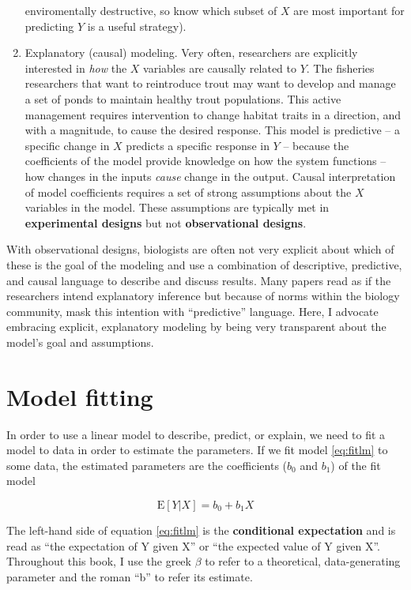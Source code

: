 \documentclass[]{book}
\theoremstyle{definition}
\theoremstyle{definition}
\theoremstyle{definition}
\theoremstyle{remark}
\begin{document}
\begin{enumerate}
  enviromentally destructive, so know which subset of \(X\) are most
  important for predicting \(Y\) is a useful strategy).
\item
  Explanatory (causal) modeling. Very often, researchers are explicitly
  interested in \emph{how} the \(X\) variables are causally related to
  \(Y\). The fisheries researchers that want to reintroduce trout may
  want to develop and manage a set of ponds to maintain healthy trout
  populations. This active management requires intervention to change
  habitat traits in a direction, and with a magnitude, to cause the
  desired response. This model is predictive -- a specific change in
  \(X\) predicts a specific response in \(Y\) -- because the
  coefficients of the model provide knowledge on how the system
  functions -- how changes in the inputs \emph{cause} change in the
  output. Causal interpretation of model coefficients requires a set of
  strong assumptions about the \(X\) variables in the model. These
  assumptions are typically met in \textbf{experimental designs} but not
  \textbf{observational designs}.
\end{enumerate}

With observational designs, biologists are often not very explicit about
which of these is the goal of the modeling and use a combination of
descriptive, predictive, and causal language to describe and discuss
results. Many papers read as if the researchers intend explanatory
inference but because of norms within the biology community, mask this
intention with ``predictive'' language. Here, I advocate embracing
explicit, explanatory modeling by being very transparent about the
model's goal and assumptions.

\section{Model fitting}\label{model-fitting}

In order to use a linear model to describe, predict, or explain, we need
to fit a model to data in order to estimate the parameters. If we fit
model \eqref{eq:fitlm} to some data, the estimated parameters are the
coefficients (\(b_0\) and \(b_1\)) of the fit model

\begin{equation}
\mathrm{E}[Y|X] = b_0 + b_1 X
\label{eq:fitlm}
\end{equation}

The left-hand side of equation \eqref{eq:fitlm} is the \textbf{conditional
expectation} and is read as ``the expectation of Y given X'' or ``the
expected value of Y given X''. Throughout this book, I use the greek
\(\beta\) to refer to a theoretical, data-generating parameter and the
roman ``b'' to refer its estimate.
\end{document}
